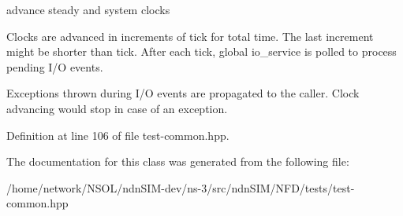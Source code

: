 advance steady and system clocks 

Clocks are advanced in increments of {\ttfamily tick} for {\ttfamily total} time. The last increment might be shorter than {\ttfamily tick}. After each tick, global io\+\_\+service is polled to process pending I/O events.

Exceptions thrown during I/O events are propagated to the caller. Clock advancing would stop in case of an exception. 

Definition at line 106 of file test-\/common.\+hpp.



The documentation for this class was generated from the following file\+:\begin{DoxyCompactItemize}
\item 
/home/network/\+N\+S\+O\+L/ndn\+S\+I\+M-\/dev/ns-\/3/src/ndn\+S\+I\+M/\+N\+F\+D/tests/test-\/common.\+hpp\end{DoxyCompactItemize}
